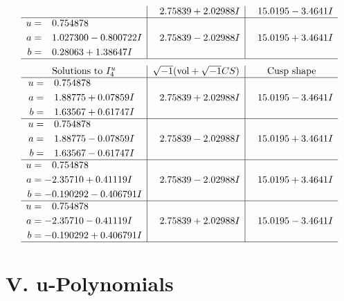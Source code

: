 \documentclass[1p]{elsarticle_modified}
\theoremstyle{definition}
\newcommand{\I}{\sqrt{-1}}
\begin{document}
$$\begin{array}{c|c|c}
 & \phantom{-}2.75839 + 2.02988 I & \phantom{-}15.0195 - 3.4641 I \\ \hline\begin{aligned}
u &= \phantom{-}0.754878\phantom{ +0.000000I} \\
a &= \phantom{-}1.027300 - 0.800722 I \\
b &= \phantom{-}0.28063 + 1.38647 I\end{aligned}
 & \phantom{-}2.75839 - 2.02988 I & \phantom{-}15.0195 + 3.4641 I\\
 \hline 
 \end{array}$$\newpage$$\begin{array}{c|c|c}  
\text{Solutions to }I^u_{4}& \I (\text{vol} + \sqrt{-1}CS) & \text{Cusp shape}\\
 \hline 
\begin{aligned}
u &= \phantom{-}0.754878\phantom{ +0.000000I} \\
a &= \phantom{-}1.88775 + 0.07859 I \\
b &= \phantom{-}1.63567 + 0.61747 I\end{aligned}
 & \phantom{-}2.75839 + 2.02988 I & \phantom{-}15.0195 - 3.4641 I \\ \hline\begin{aligned}
u &= \phantom{-}0.754878\phantom{ +0.000000I} \\
a &= \phantom{-}1.88775 - 0.07859 I \\
b &= \phantom{-}1.63567 - 0.61747 I\end{aligned}
 & \phantom{-}2.75839 - 2.02988 I & \phantom{-}15.0195 + 3.4641 I \\ \hline\begin{aligned}
u &= \phantom{-}0.754878\phantom{ +0.000000I} \\
a &= -2.35710 + 0.41119 I \\
b &= -0.190292 - 0.406791 I\end{aligned}
 & \phantom{-}2.75839 - 2.02988 I & \phantom{-}15.0195 + 3.4641 I \\ \hline\begin{aligned}
u &= \phantom{-}0.754878\phantom{ +0.000000I} \\
a &= -2.35710 - 0.41119 I \\
b &= -0.190292 + 0.406791 I\end{aligned}
 & \phantom{-}2.75839 + 2.02988 I & \phantom{-}15.0195 - 3.4641 I\\
 \hline 
 \end{array}$$\newpage
\newpage\renewcommand{\arraystretch}{1}
\centering \section*{ V. u-Polynomials}
\end{document}
